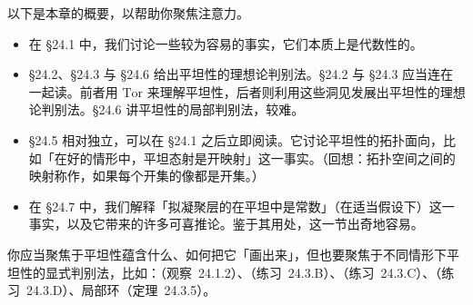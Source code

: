 以下是本章的概要，以帮助你聚焦注意力。
\begin{itemize}
\item 在 \S24.1 中，我们讨论一些较为容易的事实，它们本质上是代数性的。
\item \S24.2、\S24.3 与 \S24.6 给出平坦性的理想论判别法。\S24.2 与 \S24.3 应当连在一起读。前者用 $\mathrm{Tor}$ 来理解平坦性，后者则利用这些洞见发展出平坦性的理想论判别法。\S24.6 讲平坦性的局部判别法，较难。
\item \S24.5 相对独立，可以在 \S24.1 之后立即阅读。它讨论平坦性的拓扑面向，比如「在好的情形中，平坦态射是开映射」这一事实。（回想：拓扑空间之间的映射称作\trOpenMap，如果每个开集的像都是开集。）
\item 在 \S24.7 中，我们解释「拟凝聚层的\trEulerCharacteristic{}在平坦\trFamily{}中是常数」（在适当假设下）这一事实，以及它带来的许多可喜推论。鉴于其用处，这一节出奇地容易。
\end{itemize}

你应当聚焦于平坦性蕴含什么、如何把它「画出来」，但也要聚焦于不同情形下平坦性的显式判别法，比如：\trIntegralDomain（\mbox{观察~24.1.2}）、\trPID（\mbox{练习~24.3.B}）、\trDVR（\mbox{练习~24.3.C}）、\trDualNumbers（\mbox{练习~24.3.D}）、局部环（\mbox{定理~24.3.5}）。









